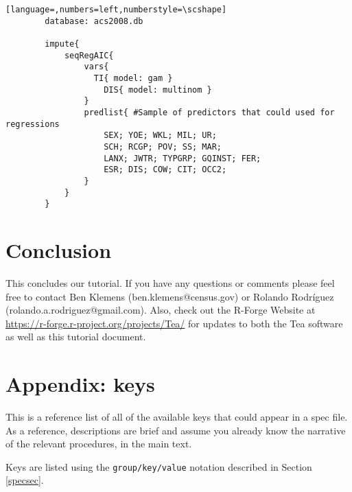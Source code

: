 \documentclass{article}
\begin{document}
        \begin{lstlisting}[language=,numbers=left,numberstyle=\scshape]
        database: acs2008.db

        impute{
            seqRegAIC{
                vars{
                  TI{ model: gam }
                    DIS{ model: multinom }
                }
                predlist{ #Sample of predictors that could used for regressions
                    SEX; YOE; WKL; MIL; UR;
                    SCH; RCGP; POV; SS; MAR;
                    LANX; JWTR; TYPGRP; GQINST; FER;
                    ESR; DIS; COW; CIT; OCC2;
                }
            }
        }

        \end{lstlisting}


\section{Conclusion}
This concludes our tutorial. If you have any questions or comments please feel
free to contact Ben Klemens (ben.klemens@census.gov) or Rolando Rodr\'iguez
(rolando.a.rodriguez@gmail.com). Also, check out the R-Forge Website at
\url{https://r-forge.r-project.org/projects/Tea/} for updates to both the Tea software
as well as this tutorial document.

\section*{Appendix: keys}

This is a reference list of all of the available keys that could appear in a spec file.
As a reference, descriptions are brief and assume you already know the narrative of the
relevant procedures, in the main text.

Keys are listed using the {\tt group/key/value} notation described in Section \ref{specsec}.

%

%
%
%
\end{document}
